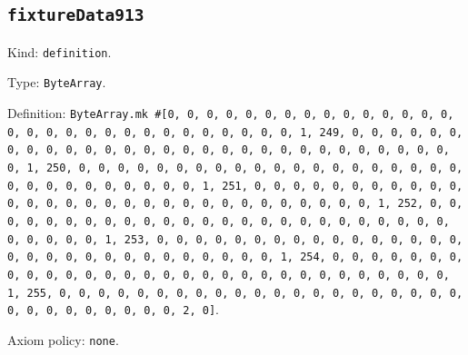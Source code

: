 \documentclass[11pt]{article}
\begin{document}
\subsection*{\texttt{fixtureData913}}
\noindent Kind: \texttt{definition}.\par
\noindent Type: \texttt{ByteArray}.\par
\noindent Definition: \texttt{ByteArray.mk \#[0, 0, 0, 0, 0, 0, 0, 0, 0, 0, 0, 0, 0, 0, 0, 0, 0, 0, 0, 0, 0, 0, 0, 0, 0, 0, 0, 0, 0, 0, 1, 249, 0, 0, 0, 0, 0, 0, 0, 0, 0, 0, 0, 0, 0, 0, 0, 0, 0, 0, 0, 0, 0, 0, 0, 0, 0, 0, 0, 0, 0, 0, 1, 250, 0, 0, 0, 0, 0, 0, 0, 0, 0, 0, 0, 0, 0, 0, 0, 0, 0, 0, 0, 0, 0, 0, 0, 0, 0, 0, 0, 0, 0, 0, 1, 251, 0, 0, 0, 0, 0, 0, 0, 0, 0, 0, 0, 0, 0, 0, 0, 0, 0, 0, 0, 0, 0, 0, 0, 0, 0, 0, 0, 0, 0, 0, 1, 252, 0, 0, 0, 0, 0, 0, 0, 0, 0, 0, 0, 0, 0, 0, 0, 0, 0, 0, 0, 0, 0, 0, 0, 0, 0, 0, 0, 0, 0, 0, 1, 253, 0, 0, 0, 0, 0, 0, 0, 0, 0, 0, 0, 0, 0, 0, 0, 0, 0, 0, 0, 0, 0, 0, 0, 0, 0, 0, 0, 0, 0, 0, 1, 254, 0, 0, 0, 0, 0, 0, 0, 0, 0, 0, 0, 0, 0, 0, 0, 0, 0, 0, 0, 0, 0, 0, 0, 0, 0, 0, 0, 0, 0, 0, 1, 255, 0, 0, 0, 0, 0, 0, 0, 0, 0, 0, 0, 0, 0, 0, 0, 0, 0, 0, 0, 0, 0, 0, 0, 0, 0, 0, 0, 0, 0, 0, 2, 0]}.\par
\noindent Axiom policy: \texttt{none}.\par
\end{document}
